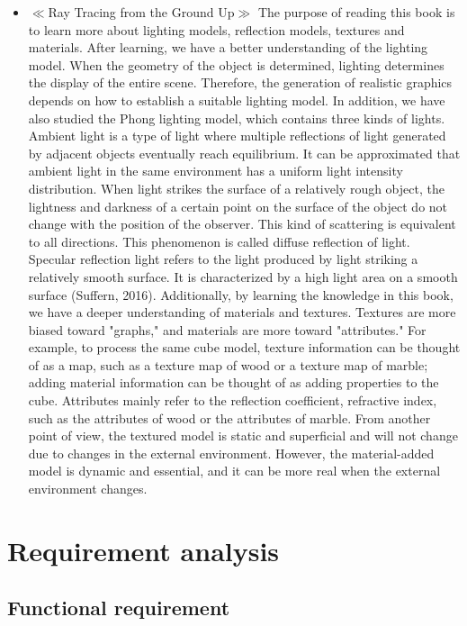 \documentclass[11pt]{article}
\begin{document}
\begin{itemize}
\item
$\ll$Ray Tracing from the Ground Up$\gg$
The purpose of reading this book is to learn more about lighting models, reflection models, textures and materials. After learning, we have a better understanding of the lighting model. When the geometry of the object is determined, lighting determines the display of the entire scene. Therefore, the generation of realistic graphics depends on how to establish a suitable lighting model. In addition, we have also studied the Phong lighting model, which contains three kinds of lights. Ambient light is a type of light where multiple reflections of light generated by adjacent objects eventually reach equilibrium. It can be approximated that ambient light in the same environment has a uniform light intensity distribution. When light strikes the surface of a relatively rough object, the lightness and darkness of a certain point on the surface of the object do not change with the position of the observer. This kind of scattering is equivalent to all directions. This phenomenon is called diffuse reflection of light. Specular reflection light refers to the light produced by light striking a relatively smooth surface. It is characterized by a high light area on a smooth surface (Suffern, 2016).
Additionally, by learning the knowledge in this book, we have a deeper understanding of materials and textures. Textures are more biased toward "graphs," and materials are more toward "attributes." For example, to process the same cube model, texture information can be thought of as a map, such as a texture map of wood or a texture map of marble; adding material information can be thought of as adding properties to the cube. Attributes mainly refer to the reflection coefficient, refractive index, such as the attributes of wood or the attributes of marble. From another point of view, the textured model is static and superficial and will not change due to changes in the external environment. However, the material-added model is dynamic and essential, and it can be more real when the external environment changes.

\end{itemize}
\section{Requirement analysis}
\subsection{Functional requirement}
\end{document}
